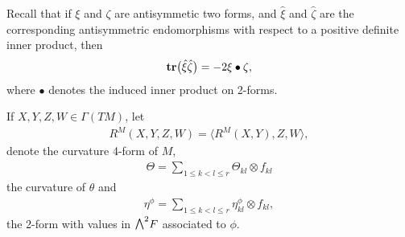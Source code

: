 \documentclass[pdftex]{sigma}
\newcommand{\ext}{\raise1pt\hbox{\small$\bigwedge$}}
\newcommand{\tr}{\mbox{\bf tr}}
\numberwithin{equation}{section}
\begin{document}
Recall that if $\xi$ and $\zeta$ are antisymmetic two forms, and $\hat\xi$ and $\hat\zeta$ are the corresponding antisymmetric endomorphisms with respect to a positive definite inner product, then
\begin{gather*}\tr\big(\hat\xi\hat\zeta\big) = -2 \xi\bullet\zeta,\end{gather*}
where $\bullet$ denotes the induced inner product on 2-forms.

If $X,Y,Z,W\in\Gamma(TM)$, let
\begin{gather*}R^M(X,Y,Z,W)=\big\langle R^M(X,Y),Z,W\big\rangle ,\end{gather*}
denote the curvature 4-form of $M$,
\begin{gather*}
 \Theta = \sum_{1\leq k<l \leq r} \Theta_{kl}\otimes f_{kl}
\end{gather*}
the curvature of $\theta$
and
\begin{gather*}
 \eta^\phi = \sum_{1\leq k<l \leq r} \eta_{kl}^\phi\otimes f_{kl},
\end{gather*}
the 2-form with values in $\ext^2F$ associated to $\phi$.
\end{document}
